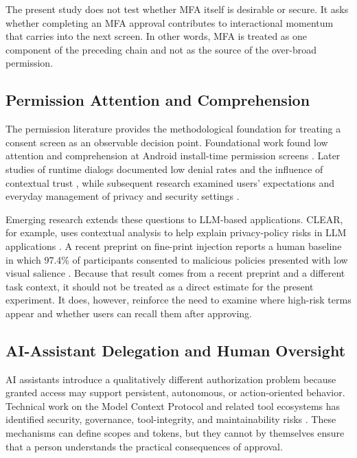 \documentclass[11pt]{article}
\begin{document}
The present study does not test whether MFA itself is desirable or secure. It
asks whether completing an MFA approval contributes to interactional momentum
that carries into the next screen. In other words, MFA is treated as one
component of the preceding chain and not as the source of the over-broad
permission.

\subsection{Permission Attention and Comprehension}
\label{sec:rw-permissions}

The permission literature provides the methodological foundation for treating
a consent screen as an observable decision point. Foundational work found low
attention and comprehension at Android install-time permission screens
\cite{felt2012android}. Later studies of runtime dialogs documented low denial
rates and the influence of contextual trust
\cite{bonne2017exploring}, while subsequent research examined users'
expectations and everyday management of privacy and security settings
\cite{frik2022expectations}.

Emerging research extends these questions to LLM-based applications. CLEAR,
for example, uses contextual analysis to help explain privacy-policy risks in
LLM applications \cite{chen2025clear}. A recent preprint on fine-print
injection reports a human baseline in which 97.4\% of participants consented to
malicious policies presented with low visual salience
\cite{chen2025fineprint}. Because that result comes from a recent preprint and
a different task context, it should not be treated as a direct estimate for
the present experiment. It does, however, reinforce the need to examine where
high-risk terms appear and whether users can recall them after approving.

\subsection{AI-Assistant Delegation and Human Oversight}
\label{sec:rw-agents}

AI assistants introduce a qualitatively different authorization problem
because granted access may support persistent, autonomous, or action-oriented
behavior. Technical work on the Model Context Protocol and related tool
ecosystems has identified security, governance, tool-integrity, and
maintainability risks
\cite{hasan2025mcpfirstglance,errico2025securingmcp,gaire2025sokmcp,bhatt2025etdi}.
These mechanisms can define scopes and tokens, but they cannot by themselves
ensure that a person understands the practical consequences of approval.
\end{document}

